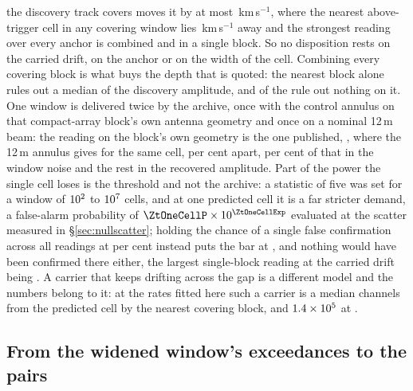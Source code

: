the discovery track covers moves it by at most \AnSpanMaxKms\,km\,s$^{-1}$,
where the nearest above-trigger cell in any covering window lies
\AnNearKms\,km\,s$^{-1}$ away and the strongest reading over every anchor is
\AnTBest{} combined and \AnTSingle{} in a single block. So no disposition
rests on the carried drift, on the anchor or on the width of the cell.
Combining every covering block is what buys the depth that is quoted: the
nearest block alone rules out a median \TjFracNearMed{} of the discovery
amplitude, and \TjNNearWeak{} of the \RcNExcl{} rule out nothing on it. One
window is delivered twice by the archive, once with the control annulus on
that compact-array block's own antenna geometry and once on a nominal 12\,m
beam: the reading on the block's own geometry is the one published,
\LrSuppPub, where the 12\,m annulus gives \LrSuppOwn{} for the same cell,
\LrSuppPct{} per cent apart, \NbProvRmsPct{} per cent of that in the window
noise and the rest in the recovered amplitude. Part
of the power the single cell loses is the threshold and not the archive: a
statistic of five was set for a window of $10^{2}$ to
$10^{7}$ cells, and at
one predicted cell it is a far stricter demand, a false-alarm probability of
$\ZtOneCellP\times10^{\ZtOneCellExp}$ evaluated at the scatter measured in
\S\ref{sec:nullscatter}; holding the chance of a single false confirmation
across all \RcNRepeatMeas{} readings at \ZtFwPct{} per cent instead puts the
bar at \ZtTrialThr, and nothing would have been confirmed there either, the
largest single-block reading at the carried drift being \RcTMatched. A
carrier that keeps drifting across the gap is a different model and the
numbers belong to it: at the rates fitted here such a carrier is a median
\RgWalkChMed{} channels from the predicted cell by the nearest covering
block, and $1.4\times10^{5}$ at \RgWalkStar.

\subsection{From the widened window's exceedances to the pairs}
\label{sec:pairacct}

